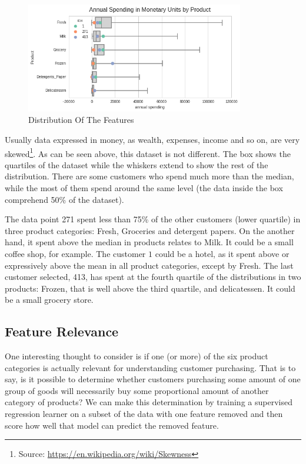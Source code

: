 \documentclass[a4paper]{article}
\begin{document}
\begin{figure}[ht!]
\centering
\includegraphics[width=0.85\textwidth]{figures/boxplot_features_new.png}
\caption{\label{fig:boxplot}Distribution Of The Features}
\end{figure}

Usually data expressed in money, as wealth, expenses, income and so on, are very skewed\footnote{Source: \url{https://en.wikipedia.org/wiki/Skewness}}. As can be seen above, this dataset is not different. The box shows the quartiles of the dataset while the whiskers extend to show the rest of the distribution. There are some customers who spend much more than the median, while the most of them spend around the same level (the data inside the box comprehend 50\% of the dataset).

The data point 271 spent less than 75\% of the other customers (lower quartile) in three product categories: Fresh, Groceries and detergent papers. On the another hand, it spent above the median in products relates to Milk. It could be a small coffee shop, for example. The customer $1$ could be a hotel, as it spent above or expressively above the mean in all product categories, except by Fresh. The last customer selected, 413, has spent at the fourth quartile of the distributions in two products: Frozen, that is well above the third quartile, and delicatessen. It could be a small grocery store.

\newpage
\subsection{Feature Relevance}
One interesting thought to consider is if one (or more) of the six product categories is actually relevant for understanding customer purchasing. That is to say, is it possible to determine whether customers purchasing some amount of one group of goods will necessarily buy some proportional amount of another category of products? We can make this determination by training a supervised regression learner on a subset of the data with one feature removed and then score how well that model can predict the removed feature.
\end{document}
